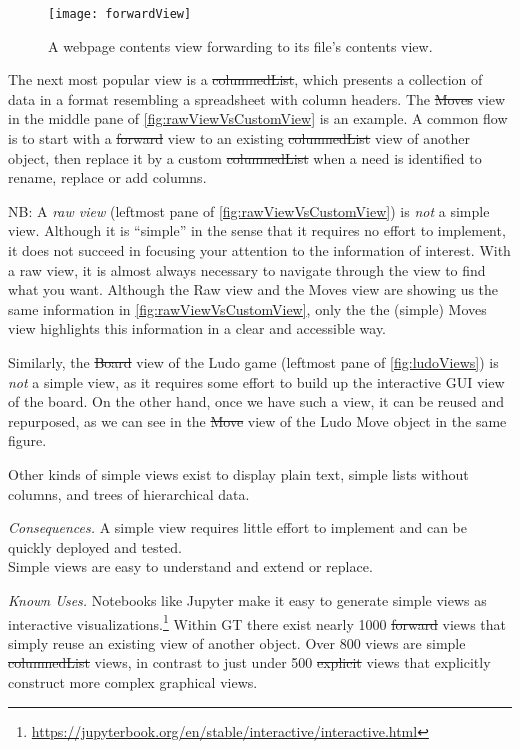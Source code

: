 \documentclass[acmsmall,screen,authorversion,nonacm]{acmart} %
\newcommand\eog[1]{\nbc{Edward}{#1}{purple}}
\newcommand\cp[1]{\nbe{Cesare}{#1}{olive}} %
\newcommand{\patsec}[1]{\noindent\textit{#1.}\xspace}
\begin{document}
\begin{figure}[h]
  \texttt{[image: forwardView]}
  \caption{A webpage contents view forwarding to its file's contents view.}
  \label{fig:forwardView}
\end{figure}

The next most popular view is a \st{columnedList}, which presents a collection of data in a format resembling a spreadsheet with column headers.
The \st{Moves} view in the middle pane of \autoref{fig:rawViewVsCustomView} is an example.
A common flow is to start with a \st{forward} view to an existing \st{columnedList} view of another object, then replace it by a custom \st{columnedList} when a need is identified to rename, replace or add columns.


NB: A \emph{raw view} (leftmost pane of \autoref{fig:rawViewVsCustomView}) is \emph{not} a simple view.
Although it is ``simple'' in the sense that it requires no effort to implement, it does not succeed in focusing your attention to the information of interest.
With a raw view, it is almost always necessary to navigate through the view to find what you want.
Although the Raw view and the Moves view are showing us the same information in \autoref{fig:rawViewVsCustomView}, only the the (simple) Moves view highlights this information in a clear and accessible way.

Similarly, the \st{Board} view of the Ludo game (leftmost pane of \autoref{fig:ludoViews}) is \emph{not} a simple view, as it requires some effort to build up the interactive GUI view of the board.
On the other hand, once we have such a view, it can be reused and repurposed, as we can see in the \st{Move} view of the Ludo Move object in the same figure.

Other kinds of simple views exist to display plain text, simple lists without columns, and trees of hierarchical data.

\patsec{Consequences}
A simple view requires little effort to implement and can be quickly deployed and tested.\\
Simple views are easy to understand and extend or replace.

\patsec{Known Uses}
Notebooks like Jupyter make it easy to generate simple views as interactive visualizations.\footnote{\href{https://web.archive.org/web/20240430071604/https://jupyterbook.org/en/stable/interactive/interactive.html}{https://jupyterbook.org/en/stable/interactive/interactive.html}}
Within GT there exist nearly 1000 \st{forward} views that simply reuse an existing view of another object.
Over 800 views are simple \st{columnedList} views, in contrast to just under 500 \st{explicit} views that explicitly construct more complex graphical views.
\end{document}
